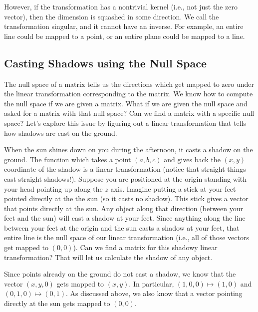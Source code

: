However, if the transformation has a nontrivial kernel (i.e., not just the zero vector), then the dimension is squashed in some direction. We call the transformation singular, and it cannot have an inverse. For example, an entire line could be mapped to a point, or an entire plane could be mapped to a line.  


\subsection{Casting Shadows using the Null Space}

The null space of a matrix tells us the directions which get mapped to zero under the linear transformation corresponding to the matrix.  We know how to compute the null space if we are given a matrix.  What if we are given the null space and asked for a matrix with that null space?  Can we find a matrix with a specific null space?  Let's explore this issue by figuring out a linear transformation that tells how shadows are cast on the ground.

When the sun shines down on you during the afternoon, it casts a shadow on the ground.  The function which takes a point $(a,b,c)$ and gives back the $(x,y)$ coordinate of the shadow is a linear transformation (notice that straight things cast straight shadows!).  Suppose you are positioned at the origin standing with your head pointing up along the $z$ axis.  Imagine putting a stick at your feet pointed directly at the the sun (so it casts no shadow).  This stick gives a vector that points directly at the sun.  Any object along that direction (between your feet and the sun) will cast a shadow at your feet.   Since anything along the line between your feet at the origin and the sun casts a shadow at your feet, that entire line is the null space of our linear transformation (i.e., all of those vectors get mapped to $(0,0)$).  Can we find a matrix for this shadowy linear transformation?  That will let us calculate the shadow of any object.

Since points already on the ground do not cast a shadow, we know that the vector $(x,y,0)$ gets mapped to $(x,y)$.  In particular, $(1,0,0)\mapsto (1,0)$ and $(0,1,0)\mapsto (0,1)$.  As discussed above, we also know that a vector pointing directly at the sun gets mapped to $(0,0)$.

